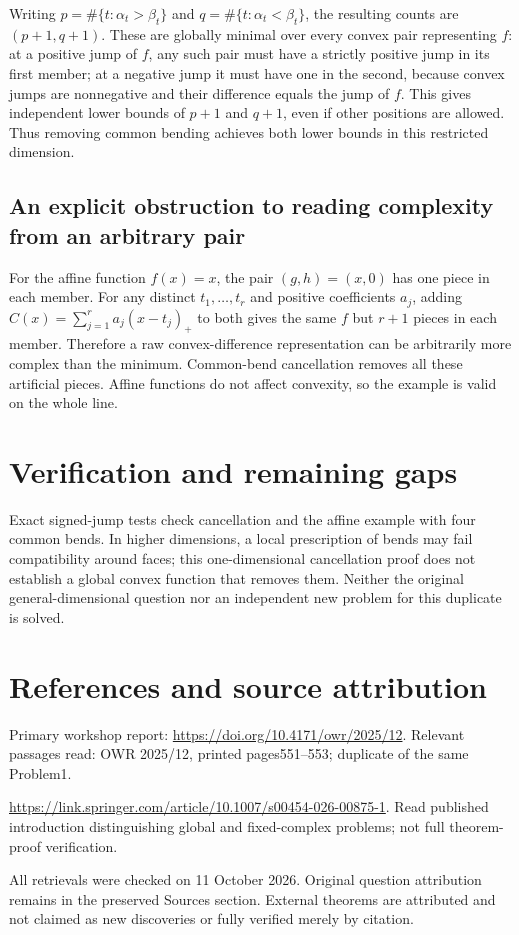 \documentclass[11pt]{article}
\begin{document}
Writing $p=\#\{t:\alpha_t>\beta_t\}$ and $q=\#\{t:\alpha_t<\beta_t\}$, the resulting counts are $(p+1,q+1)$. These are globally minimal over every convex pair representing $f$: at a positive jump of $f$, any such pair must have a strictly positive jump in its first member; at a negative jump it must have one in the second, because convex jumps are nonnegative and their difference equals the jump of $f$. This gives independent lower bounds of $p+1$ and $q+1$, even if other positions are allowed. Thus removing common bending achieves both lower bounds in this restricted dimension.
\subsection{An explicit obstruction to reading complexity from an arbitrary pair}
For the affine function $f(x)=x$, the pair $(g,h)=(x,0)$ has one piece in each member. For any distinct $t_1,\ldots,t_r$ and positive coefficients $a_j$, adding $C(x)=\sum_{j=1}^ra_j(x-t_j)_+$ to both gives the same $f$ but $r+1$ pieces in each member. Therefore a raw convex-difference representation can be arbitrarily more complex than the minimum. Common-bend cancellation removes all these artificial pieces. Affine functions do not affect convexity, so the example is valid on the whole line.
\section{Verification and remaining gaps}
Exact signed-jump tests check cancellation and the affine example with four common bends. In higher dimensions, a local prescription of bends may fail compatibility around faces; this one-dimensional cancellation proof does not establish a global convex function that removes them. Neither the original general-dimensional question nor an independent new problem for this duplicate is solved.

\section{References and source attribution}
Primary workshop report: \url{https://doi.org/10.4171/owr/2025/12}. Relevant passages read: OWR 2025/12, printed pages551--553; duplicate of the same Problem1.

\url{https://link.springer.com/article/10.1007/s00454-026-00875-1}. Read published introduction distinguishing global and fixed-complex problems; not full theorem-proof verification.

All retrievals were checked on 11 October 2026. Original question attribution remains in the preserved Sources section. External theorems are attributed and not claimed as new discoveries or fully verified merely by citation.
\end{document}
